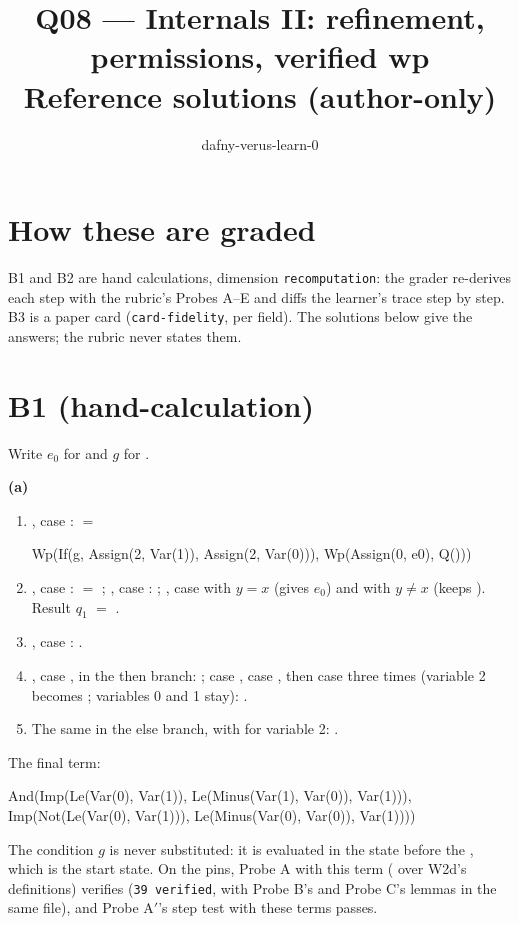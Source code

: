 \documentclass[11pt]{article}
\title{Q08 --- Internals II: refinement, permissions, verified wp \\ \large Reference solutions (author-only)}
\author{dafny-verus-learn-0}
\date{}
\begin{document}
\maketitle

\section*{How these are graded}
B1 and B2 are hand calculations, dimension \texttt{recomputation}: the grader
re-derives each step with the rubric's Probes A--E and diffs the learner's
trace step by step. B3 is a paper card (\texttt{card-fidelity}, per field). The
solutions below give the answers; the rubric never states them.

\section*{B1 (hand-calculation)}

Write $e_0$ for  and $g$ for
.

\textbf{(a)}
\begin{enumerate}
\item {}, case :  $=$
\begin{dafnycode}
Wp(If(g, Assign(2, Var(1)), Assign(2, Var(0))), Wp(Assign(0, e0), Q()))
\end{dafnycode}
\item {}, case :  $=$
  ; , case :
  ; , case
   with $y = x$ (gives $e_0$) and with $y \neq x$ (keeps
  ). Result $q_1$ $=$ .
\item {}, case : 
  .
\item {}, case , in the then branch:
  ;  case ,  case
  , then case  three times (variable 2 becomes
  ; variables 0 and 1 stay): .
\item The same in the else branch, with  for variable 2:
  .
\end{enumerate}
The final term:
\begin{dafnycode}
And(Imp(Le(Var(0), Var(1)), Le(Minus(Var(1), Var(0)), Var(1))),
    Imp(Not(Le(Var(0), Var(1))), Le(Minus(Var(0), Var(0)), Var(1))))
\end{dafnycode}
The condition $g$ is never substituted: it is evaluated in the state before
the , which is the start state. On the pins, Probe A with this term
( over W2d's definitions)
verifies (\texttt{39 verified}, with Probe B's and Probe C's lemmas in the
same file), and Probe A$'$'s step test with these terms passes.
\end{document}
